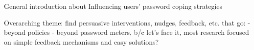 General introduction about Influencing users' password coping strategies

Overarching theme: find persuasive interventions, nudges, feedback, etc. that go:
- beyond policies
- beyond password meters, b/c let's face it, most research focused on simple feedback mechanisms and easy solutions?



